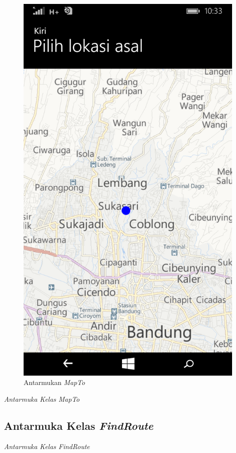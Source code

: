 \begin{figure}[h]
	\centering
		\includegraphics[scale=0.2]{Gambar/antarmuka/map}
	\caption{Antarmukan \textit{MapTo}}
	\label{fig:Antarmuka MapTo}
\end{figure}

\hspace{0.5cm} \textit{Antarmuka Kelas MapTo} 

\subsection{Antarmuka Kelas \textit{FindRoute}}
\label{lab:Antarmuka Kelas FindRoute}


\hspace{0.5cm} \textit{Antarmuka Kelas FindRoute} 